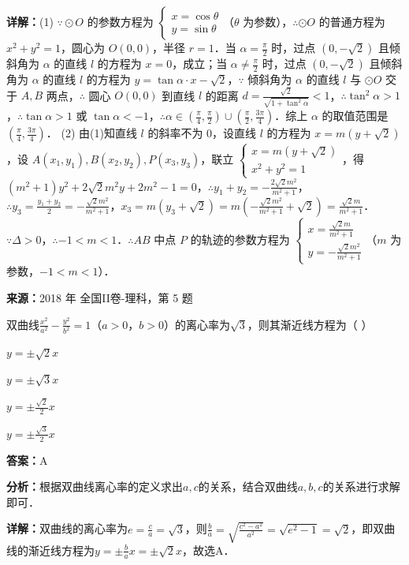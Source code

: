 \begin{question}[points=10]
\begin{solution}
\textbf{详解：}(1) $\because \odot O$ 的参数方程为 $\begin{cases} x=\cos\theta \\ y=\sin\theta \end{cases}$（$\theta$ 为参数），$\therefore \odot O$ 的普通方程为 $x^2+y^2=1$，圆心为 $O(0,0)$，半径 $r=1$．当 $\alpha=\frac{\pi}{2}$ 时，过点 $(0,-\sqrt{2})$ 且倾斜角为 $\alpha$ 的直线 $l$ 的方程为 $x=0$，成立；当 $\alpha\neq\frac{\pi}{2}$ 时，过点 $(0,-\sqrt{2})$ 且倾斜角为 $\alpha$ 的直线 $l$ 的方程为 $y=\tan\alpha\cdot x-\sqrt{2}$，$\because$ 倾斜角为 $\alpha$ 的直线 $l$ 与 $\odot O$ 交于 $A,B$ 两点，$\therefore$ 圆心 $O(0,0)$ 到直线 $l$ 的距离 $d=\frac{\sqrt{2}}{\sqrt{1+\tan^2\alpha}}<1$，$\therefore \tan^2\alpha>1$，$\therefore \tan\alpha>1$ 或 $\tan\alpha<-1$，$\therefore \alpha\in(\frac{\pi}{4},\frac{\pi}{2})\cup(\frac{\pi}{2},\frac{3\pi}{4})$．综上 $\alpha$ 的取值范围是 $(\frac{\pi}{4},\frac{3\pi}{4})$．
(2) 由(1)知直线 $l$ 的斜率不为 $0$，设直线 $l$ 的方程为 $x=m(y+\sqrt{2})$，设 $A(x_1,y_1),B(x_2,y_2),P(x_3,y_3)$，联立 $\begin{cases} x=m(y+\sqrt{2}) \\ x^2+y^2=1 \end{cases}$，得 $(m^2+1)y^2+2\sqrt{2}m^2y+2m^2-1=0$，$\therefore y_1+y_2=-\frac{2\sqrt{2}m^2}{m^2+1}$，$\therefore y_3=\frac{y_1+y_2}{2}=-\frac{\sqrt{2}m^2}{m^2+1}$，$x_3=m(y_3+\sqrt{2})=m(-\frac{\sqrt{2}m^2}{m^2+1}+\sqrt{2})=\frac{\sqrt{2}m}{m^2+1}$．$\because \Delta>0$，$\therefore -1<m<1$．$\therefore AB$ 中点 $P$ 的轨迹的参数方程为 $\begin{cases} x=\frac{\sqrt{2}m}{m^2+1} \\ y=-\frac{\sqrt{2}m^2}{m^2+1} \end{cases}$（$m$ 为参数，$-1<m<1$）．
\end{solution}
\end{question}

\begin{question}[points=5]
\textbf{来源：}2018 年 全国II卷-理科，第 5 题\par
双曲线$\frac{x^2}{a^2}-\frac{y^2}{b^2}=1$（$a>0$，$b>0$）的离心率为$\sqrt{3}$，则其渐近线方程为（     ）
\begin{choices}
  \item $y=\pm\sqrt{2}x$
  \item $y=\pm\sqrt{3}x$
  \item $y=\pm\frac{\sqrt{2}}{2}x$
  \item $y=\pm\frac{\sqrt{3}}{2}x$
\end{choices}
\begin{solution}
\textbf{答案：}A

\textbf{分析：}根据双曲线离心率的定义求出$a,c$的关系，结合双曲线$a,b,c$的关系进行求解即可．

\textbf{详解：}双曲线的离心率为$e=\frac{c}{a}=\sqrt{3}$，则$\frac{b}{a}=\sqrt{\frac{c^2-a^2}{a^2}}=\sqrt{e^2-1}=\sqrt{2}$，即双曲线的渐近线方程为$y=\pm\frac{b}{a}x=\pm\sqrt{2}x$，故选A．
\end{solution}
\end{question}

